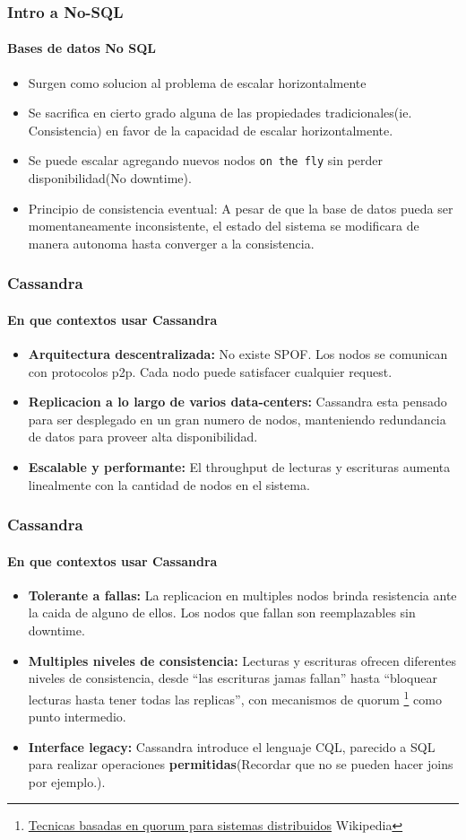\documentclass{beamer}
\begin{document}
\begin{frame}
  \frametitle{Intro a No-SQL}    
  \framesubtitle{Bases de datos No SQL}
  \begin{itemize}
    \setlength{\itemsep}{3pt}
    \item Surgen como solucion al problema de escalar horizontalmente
    \pause
    \item Se sacrifica en cierto grado alguna de las propiedades tradicionales(ie. Consistencia) en favor de la capacidad de escalar horizontalmente.
    \pause
    \item Se puede escalar agregando nuevos nodos \texttt{on the fly} sin perder disponibilidad(No downtime).
    \pause
    \item Principio de consistencia eventual: A pesar de que la base de datos pueda ser momentaneamente inconsistente, el estado del sistema se modificara de manera autonoma hasta converger a la consistencia.
  \end{itemize}
\end{frame}

\begin{frame}
  \frametitle{Cassandra}
  \framesubtitle{En que contextos usar Cassandra}
  \begin{itemize}
    \setlength{\itemsep}{3pt}
    \item \textbf{Arquitectura descentralizada:} No existe SPOF. Los nodos se comunican con protocolos p2p. Cada nodo puede satisfacer cualquier request.
    \pause
    \item \textbf{Replicacion a lo largo de varios data-centers: } Cassandra esta pensado para ser desplegado en un gran numero de nodos, manteniendo redundancia de datos para proveer alta disponibilidad.
    \pause
    \item \textbf{Escalable y performante: } El throughput de lecturas y escrituras aumenta linealmente con la cantidad de nodos en el sistema.
  \end{itemize}
\end{frame}

\begin{frame}
  \frametitle{Cassandra}
  \framesubtitle{En que contextos usar Cassandra}
  \begin{itemize}
    \setlength{\itemsep}{3pt}
    \item \textbf{Tolerante a fallas: } La replicacion en multiples nodos brinda resistencia ante la caida de alguno de ellos. Los nodos que fallan son reemplazables sin downtime.
    \pause
    \item \textbf{Multiples niveles de consistencia: } Lecturas y escrituras ofrecen diferentes niveles de consistencia, desde ``las escrituras jamas fallan'' hasta ``bloquear lecturas hasta tener todas las replicas'', con mecanismos de quorum \footnote{ \href{https://en.wikipedia.org/wiki/Quorum_(distributed_computing)}{Tecnicas basadas en quorum para sistemas distribuidos} Wikipedia} como punto intermedio.
    \pause
    \item \textbf{Interface legacy: } Cassandra introduce el lenguaje CQL, parecido a SQL para realizar operaciones \textbf{permitidas}(Recordar que no se pueden hacer joins por ejemplo.).
  \end{itemize}
\end{frame}
\end{document}
